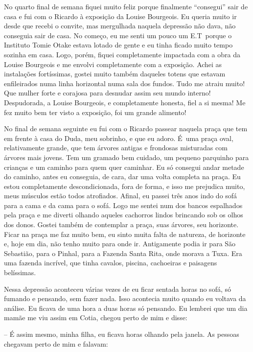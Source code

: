 No quarto final de semana fiquei muito feliz porque finalmente
``consegui'' sair de casa e fui com o Ricardo à exposição da Louise
Bourgeois. Eu queria muito ir desde que recebi o convite, mas mergulhada
naquela depressão não dava, não conseguia sair de casa. No começo, eu me
senti um pouco um E.T\, porque o Instituto Tomie Otake estava lotado de
gente e eu tinha ficado muito tempo sozinha em casa. Logo, porém, fiquei
completamente impactada com a obra da Louise Bourgeois e me envolvi
completamente com a exposição. Achei as instalações fortíssimas, gostei
muito também daqueles totens que estavam enfileirados numa linha
horizontal numa sala dos fundos. Tudo me atraiu muito! Que mulher forte
e corajosa para desnudar assim seu mundo interno! Despudorada, a Louise
Bourgeois, e completamente honesta, fiel a si mesma! Me fez muito bem
ter visto a exposição, foi um grande alimento!

No final de semana seguinte eu fui com o Ricardo passear naquela praça
que tem em frente à casa do Duda, meu sobrinho, e que eu adoro. É~uma
praça oval, relativamente grande, que tem árvores antigas e frondosas
misturadas com árvores mais jovens. Tem um gramado bem cuidado, um
pequeno parquinho para crianças e um caminho para quem quer caminhar. Eu
só consegui andar metade do caminho, antes eu conseguia, de cara, dar
uma volta completa na praça. Eu estou completamente descondicionada,
fora de forma, e isso me prejudica muito, meus músculos estão todos
atrofiados. Afinal, eu passei três anos indo do sofá para a cama e da
cama para o sofá. Logo me sentei num dos bancos espalhados pela praça e
me diverti olhando aqueles cachorros lindos brincando sob os olhos dos
donos. Gostei também de contemplar a praça, suas árvores, seu horizonte.
Ficar na praça me faz muito bem, eu sinto muita falta de natureza, de
horizonte e, hoje em dia, não tenho muito para onde ir. Antigamente
podia ir para São Sebastião, para o Pinhal, para a Fazenda Santa Rita,
onde morava a Tuxa. Era uma fazenda incrível, que tinha cavalos,
piscina, cachoeiras e paisagens belíssimas.

Nessa depressão aconteceu várias vezes de eu ficar sentada horas no
sofá, só fumando e pensando, sem fazer nada. Isso acontecia muito quando
eu voltava da análise. Eu ficava de uma hora a duas horas só pensando.
Eu lembrei que um dia mamãe me viu assim em Cotia, chegou perto de mim e
disse:

-- É assim mesmo, minha filha, eu ficava horas olhando pela janela. As
pessoas chegavam perto de mim e falavam:

